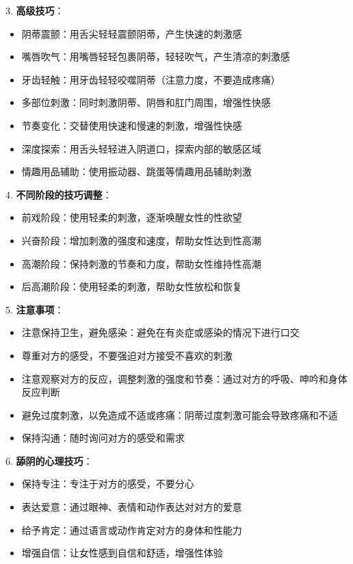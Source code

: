 \documentclass[12pt,UTF8]{ctexbook}
\begin{document}
3. \textbf{高级技巧}：
  \begin{itemize}
  \item 阴蒂震颤：用舌尖轻轻震颤阴蒂，产生快速的刺激感
  \item 嘴唇吹气：用嘴唇轻轻包裹阴蒂，轻轻吹气，产生清凉的刺激感
  \item 牙齿轻触：用牙齿轻轻咬噬阴蒂（注意力度，不要造成疼痛）
  \item 多部位刺激：同时刺激阴蒂、阴唇和肛门周围，增强性快感
  \item 节奏变化：交替使用快速和慢速的刺激，增强性快感
  \item 深度探索：用舌头轻轻进入阴道口，探索内部的敏感区域
  \item 情趣用品辅助：使用振动器、跳蛋等情趣用品辅助刺激
  \end{itemize}

4. \textbf{不同阶段的技巧调整}：
  \begin{itemize}
  \item 前戏阶段：使用轻柔的刺激，逐渐唤醒女性的性欲望
  \item 兴奋阶段：增加刺激的强度和速度，帮助女性达到性高潮
  \item 高潮阶段：保持刺激的节奏和力度，帮助女性维持性高潮
  \item 后高潮阶段：使用轻柔的刺激，帮助女性放松和恢复
  \end{itemize}

5. \textbf{注意事项}：
  \begin{itemize}
  \item 注意保持卫生，避免感染：避免在有炎症或感染的情况下进行口交
  \item 尊重对方的感受，不要强迫对方接受不喜欢的刺激
  \item 注意观察对方的反应，调整刺激的强度和节奏：通过对方的呼吸、呻吟和身体反应判断
  \item 避免过度刺激，以免造成不适或疼痛：阴蒂过度刺激可能会导致疼痛和不适
  \item 保持沟通：随时询问对方的感受和需求
  \end{itemize}

6. \textbf{舔阴的心理技巧}：
  \begin{itemize}
  \item 保持专注：专注于对方的感受，不要分心
  \item 表达爱意：通过眼神、表情和动作表达对对方的爱意
  \item 给予肯定：通过语言或动作肯定对方的身体和性能力
  \item 增强自信：让女性感到自信和舒适，增强性体验
  \end{itemize}
\end{document}
